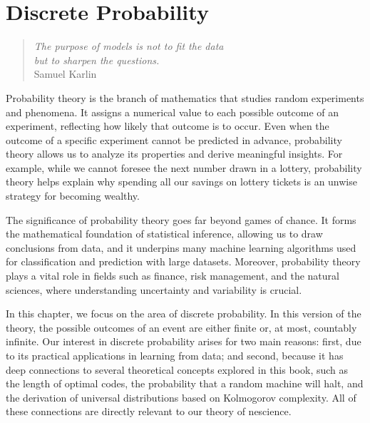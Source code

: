 %
%


\chapter{Discrete Probability}
\label{chap:Probability_Theory}

\begin{quote}
\begin{flushright}
\emph{The purpose of models is not to fit the data\\
but to sharpen the questions.}\\
Samuel Karlin
\end{flushright}
\end{quote}
\bigskip

Probability theory is the branch of mathematics that studies random experiments and phenomena. It assigns a numerical value to each possible outcome of an experiment, reflecting how likely that outcome is to occur. Even when the outcome of a specific experiment cannot be predicted in advance, probability theory allows us to analyze its properties and derive meaningful insights. For example, while we cannot foresee the next number drawn in a lottery, probability theory helps explain why spending all our savings on lottery tickets is an unwise strategy for becoming wealthy.

The significance of probability theory goes far beyond games of chance. It forms the mathematical foundation of statistical inference, allowing us to draw conclusions from data, and it underpins many machine learning algorithms used for classification and prediction with large datasets. Moreover, probability theory plays a vital role in fields such as finance, risk management, and the natural sciences, where understanding uncertainty and variability is crucial.

In this chapter, we focus on the area of discrete probability. In this version of the theory, the possible outcomes of an event are either finite or, at most, countably infinite. Our interest in discrete probability arises for two main reasons: first, due to its practical applications in learning from data; and second, because it has deep connections to several theoretical concepts explored in this book, such as the length of optimal codes, the probability that a random machine will halt, and the derivation of universal distributions based on Kolmogorov complexity. All of these connections are directly relevant to our theory of nescience.

